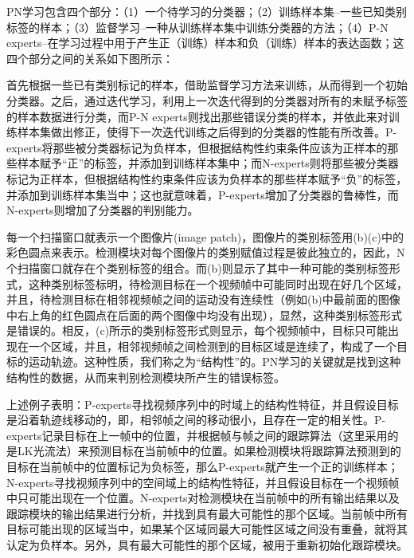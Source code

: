 PN学习包含四个部分：（1）一个待学习的分类器；（2）训练样本集–一些已知类别标签的样本；（3）监督学习–一种从训练样本集中训练分类器的方法；（4）P-N experts–在学习过程中用于产生正（训练）样本和负（训练）样本的表达函数；这四个部分之间的关系如下图所示：

首先根据一些已有类别标记的样本，借助监督学习方法来训练，从而得到一个初始分类器。之后，通过迭代学习，利用上一次迭代得到的分类器对所有的未赋予标签的样本数据进行分类，而P-N experts则找出那些错误分类的样本，并依此来对训练样本集做出修正，使得下一次迭代训练之后得到的分类器的性能有所改善。P-experts将那些被分类器标记为负样本，但根据结构性约束条件应该为正样本的那些样本赋予“正”的标签，并添加到训练样本集中；而N-experts则将那些被分类器标记为正样本，但根据结构性约束条件应该为负样本的那些样本赋予“负”的标签，并添加到训练样本集当中；这也就意味着，P-experts增加了分类器的鲁棒性，而N-experts则增加了分类器的判别能力。

每一个扫描窗口就表示一个图像片(image patch)，图像片的类别标签用(b)(c)中的彩色圆点来表示。检测模块对每个图像片的类别赋值过程是彼此独立的，因此，N个扫描窗口就存在个类别标签的组合。而(b)则显示了其中一种可能的类别标签形式，这种类别标签标明，待检测目标在一个视频帧中可能同时出现在好几个区域，并且，待检测目标在相邻视频帧之间的运动没有连续性（例如(b)中最前面的图像中右上角的红色圆点在后面的两个图像中均没有出现），显然，这种类别标签形式是错误的。相反，(c)所示的类别标签形式则显示，每个视频帧中，目标只可能出现在一个区域，并且，相邻视频帧之间检测到的目标区域是连续了，构成了一个目标的运动轨迹。这种性质，我们称之为“结构性”的。PN学习的关键就是找到这种结构性的数据，从而来判别检测模块所产生的错误标签。

上述例子表明：P-experts寻找视频序列中的时域上的结构性特征，并且假设目标是沿着轨迹线移动的，即，相邻帧之间的移动很小，且存在一定的相关性。P-experts记录目标在上一帧中的位置，并根据帧与帧之间的跟踪算法（这里采用的是LK光流法）来预测目标在当前帧中的位置。如果检测模块将跟踪算法预测到的目标在当前帧中的位置标记为负标签，那么P-experts就产生一个正的训练样本；N-experts寻找视频序列中的空间域上的结构性特征，并且假设目标在一个视频帧中只可能出现在一个位置。N-experts对检测模块在当前帧中的所有输出结果以及跟踪模块的输出结果进行分析，并找到具有最大可能性的那个区域。当前帧中所有目标可能出现的区域当中，如果某个区域同最大可能性区域之间没有重叠，就将其认定为负样本。另外，具有最大可能性的那个区域，被用于重新初始化跟踪模块。




 